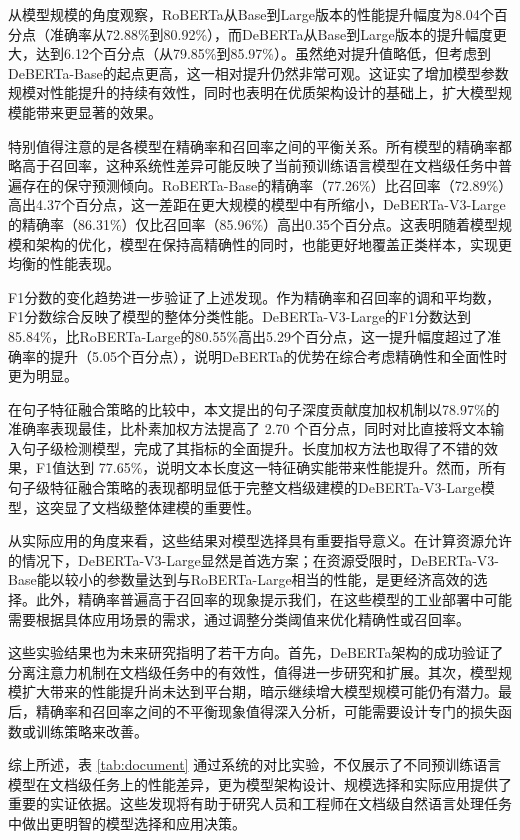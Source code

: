 从模型规模的角度观察，RoBERTa从Base到Large版本的性能提升幅度为8.04个百分点（准确率从72.88\%到80.92\%），而DeBERTa从Base到Large版本的提升幅度更大，达到6.12个百分点（从79.85\%到85.97\%）。虽然绝对提升值略低，但考虑到DeBERTa-Base的起点更高，这一相对提升仍然非常可观。这证实了增加模型参数规模对性能提升的持续有效性，同时也表明在优质架构设计的基础上，扩大模型规模能带来更显著的效果。

特别值得注意的是各模型在精确率和召回率之间的平衡关系。所有模型的精确率都略高于召回率，这种系统性差异可能反映了当前预训练语言模型在文档级任务中普遍存在的保守预测倾向。RoBERTa-Base的精确率（77.26\%）比召回率（72.89\%）高出4.37个百分点，这一差距在更大规模的模型中有所缩小，DeBERTa-V3-Large的精确率（86.31\%）仅比召回率（85.96\%）高出0.35个百分点。这表明随着模型规模和架构的优化，模型在保持高精确性的同时，也能更好地覆盖正类样本，实现更均衡的性能表现。

F1分数的变化趋势进一步验证了上述发现。作为精确率和召回率的调和平均数，F1分数综合反映了模型的整体分类性能。DeBERTa-V3-Large的F1分数达到85.84\%，比RoBERTa-Large的80.55\%高出5.29个百分点，这一提升幅度超过了准确率的提升（5.05个百分点），说明DeBERTa的优势在综合考虑精确性和全面性时更为明显。

在句子特征融合策略的比较中，本文提出的句子深度贡献度加权机制以78.97\%的准确率表现最佳，比朴素加权方法提高了 2.70 个百分点，同时对比直接将文本输入句子级检测模型，完成了其指标的全面提升。长度加权方法也取得了不错的效果，F1值达到 77.65\%，说明文本长度这一特征确实能带来性能提升。然而，所有句子级特征融合策略的表现都明显低于完整文档级建模的DeBERTa-V3-Large模型，这突显了文档级整体建模的重要性。

从实际应用的角度来看，这些结果对模型选择具有重要指导意义。在计算资源允许的情况下，DeBERTa-V3-Large显然是首选方案；在资源受限时，DeBERTa-V3-Base能以较小的参数量达到与RoBERTa-Large相当的性能，是更经济高效的选择。此外，精确率普遍高于召回率的现象提示我们，在这些模型的工业部署中可能需要根据具体应用场景的需求，通过调整分类阈值来优化精确性或召回率。

这些实验结果也为未来研究指明了若干方向。首先，DeBERTa架构的成功验证了分离注意力机制在文档级任务中的有效性，值得进一步研究和扩展。其次，模型规模扩大带来的性能提升尚未达到平台期，暗示继续增大模型规模可能仍有潜力。最后，精确率和召回率之间的不平衡现象值得深入分析，可能需要设计专门的损失函数或训练策略来改善。

综上所述，表 \ref{tab:document} 通过系统的对比实验，不仅展示了不同预训练语言模型在文档级任务上的性能差异，更为模型架构设计、规模选择和实际应用提供了重要的实证依据。这些发现将有助于研究人员和工程师在文档级自然语言处理任务中做出更明智的模型选择和应用决策。

